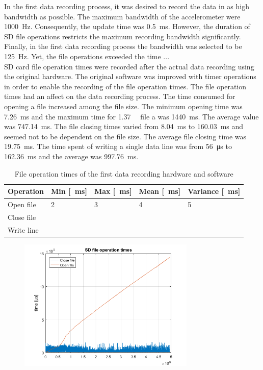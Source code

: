 \documentclass[english,12pt,a4paper,pdftex,elec,utf8]{aaltothesis}
\begin{document}
In the first data recording process, it was desired to record the data in as high bandwidth as possible. The maximum bandwidth of the accelerometer were \SI{1000}{\hertz}. Consequently, the update time was \SI{0.5}{\milli \second}. However, the duration of SD file operations restricts the maximum recording bandwidth significantly. Finally, in the first data recording process the bandwidth was selected to be \SI{125}{\hertz}. Yet, the file operations exceeded the time ... \\

SD card file operation times were recorded after the actual data recording using the original hardware. The original software was improved with timer operations in order to enable the recording of the file operation times. The file operation times had an affect on the data recording process. The time consumed for opening a file increased among the file size. The minimum opening time was \SI{7.26}{\milli\second} and the maximum time for \SI{1.37}{\giga \byte} file a was \SI{1440}{\milli \second}. The average value was \SI{747.14}{\milli \second}. The file closing times varied from \SI{8.04}{\milli \second} to \SI{160.03}{\milli \second} and seemed not to be dependent on the file size. The average file closing time was \SI{19.75}{\milli \second}. The time spent of writing a single data line was from \SI{56}{\micro \second} to \SI{162.36}{\milli\second} and the average was \SI{997.76}{\milli\second}. \\

\begin{table} \caption{File operation times of the first data recording hardware and software}
\centering
\begin{tabular}{| l | l | l | l | l |}
\hline
Operation & Min [\SI{}{\milli \second}] & Max [\SI{}{\milli \second}] & Mean [\SI{}{\milli \second}]& Variance [\SI{}{\milli \second}]\\ \hline
Open file & 2 & 3 & 4 & 5 \\ \hline
Close file &  &  &  &  \\ \hline
Write line &  &  &  &  \\ \hline
\end{tabular}
\end{table}

\begin{figure}[htb]
\centering
\includegraphics[width = 0.75\textwidth]{figures/openclosetimes_vanha.png}
\caption{} \label{}
\end{figure}
\end{document}
